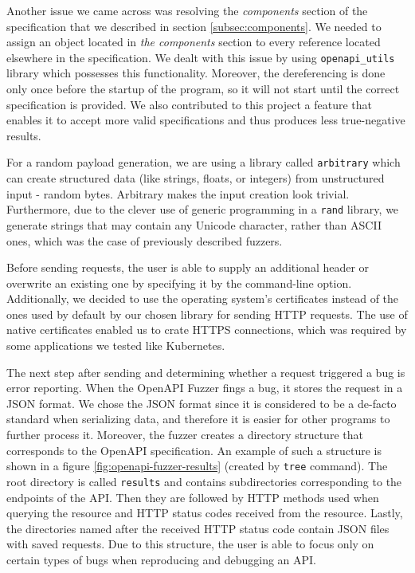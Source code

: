 Another issue we came across was resolving the \textit{components} section of the specification that we described in section \ref{subsec:components}. We needed to assign an object located in \textit{the components} section to every reference located elsewhere in the specification. We dealt with this issue by using \texttt{openapi\_utils} \cite{openapiutils2020github} library which possesses this functionality. Moreover, the dereferencing is done only once before the startup of the program, so it will not start until the correct specification is provided. We also contributed to this project a feature that enables it to accept more valid specifications and thus produces less true-negative results.

For a random payload generation, we are using a library called \texttt{arbitrary} \cite{arbitrary2020github} which can create structured data (like strings, floats, or integers) from unstructured input - random bytes. Arbitrary makes the input creation look trivial. Furthermore, due to the clever use of generic programming in a \texttt{rand} library, \cite{rand2020github} we generate strings that may contain any Unicode character, rather than ASCII ones, which was the case of previously described fuzzers.

Before sending requests, the user is able to supply an additional header or overwrite an existing one by specifying it by the command-line option. Additionally, we decided to use the operating system's certificates instead of the ones used by default by our chosen library for sending HTTP requests. The use of native certificates enabled us to crate HTTPS connections, which was required by some applications we tested like Kubernetes.

The next step after sending and determining whether a request triggered a bug is error reporting. When the OpenAPI Fuzzer fings a bug, it stores the request in a JSON format. We chose the JSON format since it is considered to be a de-facto standard when serializing data, and therefore it is easier for other programs to further process it. Moreover, the fuzzer creates a directory structure that corresponds to the OpenAPI specification. An example of such a structure is shown in a figure \ref{fig:openapi-fuzzer-results} (created by \texttt{tree} command). The root directory is called \texttt{results} and contains subdirectories corresponding to the endpoints of the API. Then they are followed by HTTP methods used when querying the resource and HTTP status codes received from the resource. Lastly, the directories named after the received HTTP status code contain JSON files with saved requests. Due to this structure, the user is able to focus only on certain types of bugs when reproducing and debugging an API.

